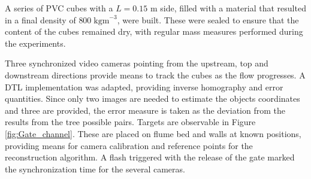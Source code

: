 A series of PVC cubes with a $L=0.15$ m side, filled with a material that resulted in a final density of $800\;\text{kgm}^{-3}$, were built. These were sealed to ensure that the content of the cubes remained dry, with regular mass measures performed during the experiments.

Three synchronized video cameras pointing from the upstream, top and downstream directions provide means to track the cubes as the flow progresses. A \ac{DTL} implementation \citep{Capel-matlab-dlt} was adapted, providing inverse homography and error quantities. Since only two images are needed to estimate the objects coordinates and three are provided, the error measure is taken as the deviation from the results from the tree possible pairs. Targets are observable in Figure \ref{fig:Gate_channel}. These are placed on flume bed and walls at known positions, providing means for camera calibration and reference points for the reconstruction algorithm. A flash triggered with the release of the gate marked the synchronization time for the several cameras.

